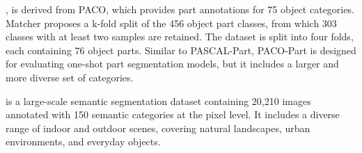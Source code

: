 , is derived from PACO,  which provides part annotations for 75 object categories. Matcher \cite{liu2023matcher} proposes a k-fold split of the 456 object part classes, from which 303 classes with at least two samples are retained. The dataset is split into four folds, each containing 76 object parts. Similar to PASCAL-Part, PACO-Part is designed for evaluating one-shot part segmentation models, but it includes a larger and more diverse set of categories.

 \cite{zhou2019semantic} is a large-scale semantic segmentation dataset containing 20,210 images annotated with 150 semantic categories at the pixel level. It includes a diverse range of indoor and outdoor scenes, covering natural landscapes, urban environments, and everyday objects. 